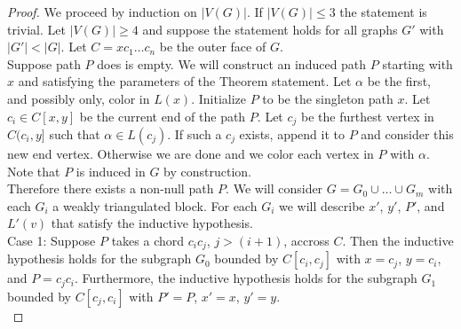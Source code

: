 \documentclass[12pt,a4paper]{article}
\begin{document}
\begin{proof}
We proceed by induction on $|V(G)|$. If $|V(G)|\le3$ the statement is trivial. Let $|V(G)|\ge4$ and suppose the
statement holds for all graphs $G'$ with $|G'|<|G|$. Let $C=xc_1\ldots c_{n}$ be the outer face of $G$.\\

\noindent Suppose path $P$ does is empty. We will construct an induced path $P$ starting with $x$ and
satisfying the parameters of the Theorem statement. Let $\alpha$ be
the first, and possibly only, color in $L(x)$.
Initialize $P$ to be the singleton path $x$. Let $c_i\in C[x,y]$ be the current end of the path $P$.
Let $c_j$ be the furthest vertex in $C(c_i,y]$ such that $\alpha\in L(c_j)$. If such a $c_j$ exists, append it
to $P$ and consider this new end vertex. Otherwise we are done and we color each vertex in $P$ with $\alpha$.
Note that $P$ is induced in $G$ by construction.\\

\noindent Therefore there exists a non-null path $P$. We will consider $G=G_0\cup\ldots\cup G_m$ with
each $G_i$ a weakly triangulated block. For each $G_i$ we will describe
$x'$, $y'$, $P'$, and $L'(v)$ that satisfy the inductive hypothesis.\\

\noindent Case 1: Suppose $P$ takes a chord $c_ic_j$,
$j>(i+1)$, accross $C$. Then the inductive hypothesis holds for the subgraph $G_0$
bounded by $C[c_i,c_j]$ with $x=c_j$, $y=c_i$, and $P=c_jc_i$. Furthermore, the inductive hypothesis
holds for the subgraph $G_1$ bounded by $C[c_j,c_i]$ with $P'=P$, $x'=x$, $y'=y$.\\


\end{proof}
\end{document}
